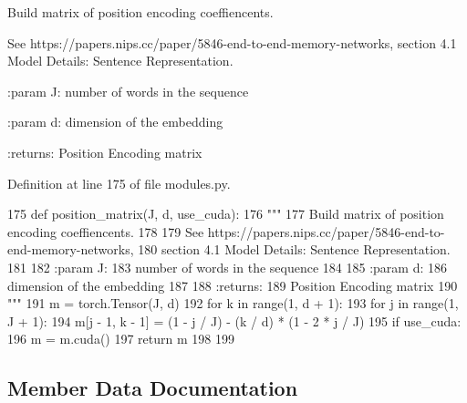 \begin{DoxyVerb}Build matrix of position encoding coeffiencents.

See https://papers.nips.cc/paper/5846-end-to-end-memory-networks,
section 4.1 Model Details: Sentence Representation.

:param J:
    number of words in the sequence

:param d:
    dimension of the embedding

:returns:
    Position Encoding matrix
\end{DoxyVerb}
 

Definition at line 175 of file modules.\+py.


\begin{DoxyCode}
175     \textcolor{keyword}{def }position\_matrix(J, d, use\_cuda):
176         \textcolor{stringliteral}{"""}
177 \textcolor{stringliteral}{        Build matrix of position encoding coeffiencents.}
178 \textcolor{stringliteral}{}
179 \textcolor{stringliteral}{        See https://papers.nips.cc/paper/5846-end-to-end-memory-networks,}
180 \textcolor{stringliteral}{        section 4.1 Model Details: Sentence Representation.}
181 \textcolor{stringliteral}{}
182 \textcolor{stringliteral}{        :param J:}
183 \textcolor{stringliteral}{            number of words in the sequence}
184 \textcolor{stringliteral}{}
185 \textcolor{stringliteral}{        :param d:}
186 \textcolor{stringliteral}{            dimension of the embedding}
187 \textcolor{stringliteral}{}
188 \textcolor{stringliteral}{        :returns:}
189 \textcolor{stringliteral}{            Position Encoding matrix}
190 \textcolor{stringliteral}{        """}
191         m = torch.Tensor(J, d)
192         \textcolor{keywordflow}{for} k \textcolor{keywordflow}{in} range(1, d + 1):
193             \textcolor{keywordflow}{for} j \textcolor{keywordflow}{in} range(1, J + 1):
194                 m[j - 1, k - 1] = (1 - j / J) - (k / d) * (1 - 2 * j / J)
195         \textcolor{keywordflow}{if} use\_cuda:
196             m = m.cuda()
197         \textcolor{keywordflow}{return} m
198 
199 
\end{DoxyCode}


\subsection{Member Data Documentation}
\mbox{\label{classparlai_1_1agents_1_1memnn_1_1modules_1_1Embed_aa77cd4b6d146e1981b96b911e6eb62c1}} 
